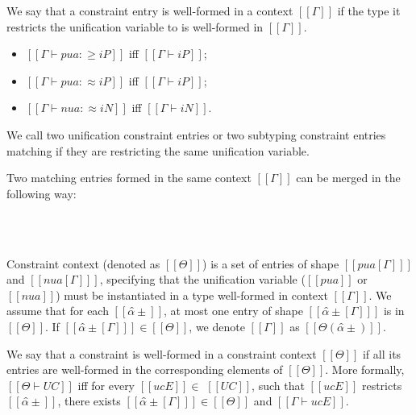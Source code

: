 \documentclass[a4,natbib=false]{article}
\begin{document}
\begin{definition}
  We say that a constraint entry is well-formed in a context $[[Γ]]$ if
  the type it restricts the unification variable to is well-formed in $[[Γ]]$.
  \begin{itemize}
    \item $[[Γ ⊢ pua :≥ iP]]$ iff $[[Γ ⊢ iP]]$;
    \item $[[Γ ⊢ pua :≈ iP]]$ iff $[[Γ ⊢ iP]]$;
    \item $[[Γ ⊢ nua :≈ iN]]$ iff $[[Γ ⊢ iN]]$.
  \end{itemize}
\end{definition}

\begin{definition} 
  We call two unification constraint entries 
  or two subtyping constraint entries matching 
  if they are restricting the same unification variable.
\end{definition}

Two matching entries formed in the same context $[[Γ]]$ 
can be merged in the following way:
\begin{definition}
   \hfill \\
\ottdefnSCME\\
\end{definition}

\begin{definition}
  Constraint context (denoted as $[[Θ]]$) is a set of entries of shape $[[ pua[Γ] ]]$ 
  and $[[ nua[Γ] ]]$, specifying that the unification variable ($[[pua]]$ or $[[nua]]$)
  must be instantiated in a type well-formed in context $[[Γ]]$.
  We assume that for each $[[α̂±]]$, at most one entry of shape $[[ α̂±[Γ] ]]$ is in $[[Θ]]$.
  If $[[ α̂±[Γ] ]] \in [[Θ]]$, we denote $[[Γ]]$ as $[[Θ(α̂±)]]$.
\end{definition}

\begin{definition}
  We say that a constraint is well-formed in a
  constraint context $[[Θ]]$ if all its entries are well-formed in
  the corresponding elements of $[[Θ]]$.
  More formally, 
  $[[Θ ⊢ UC]]$ iff for every $[[ucE]] \in $ $[[UC]]$,
  such that $[[ucE]]$ restricts $[[α̂±]]$,
  there exists $[[ α̂±[Γ] ]] \in [[Θ]]$
  and $[[Γ ⊢ ucE]]$.
\end{definition}
\end{document}
